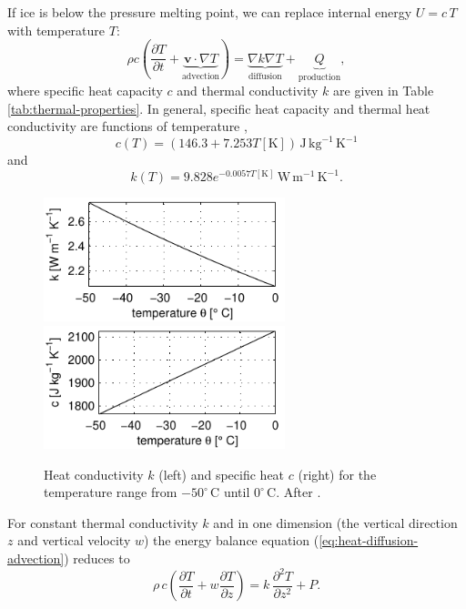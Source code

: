 \documentclass[parskip=half]{scrartcl}
\newcommand{\cels}[1]{\ensuremath{#1^{\circ}\,\mathrm{C}}}
\newcommand{\bv}{\mathbf{v}}
\newcommand{\ddz}[1]{\ensuremath{\frac{\partial #1}{\partial z}}}
\newcommand{\ddt}[1]{\ensuremath{\frac{\partial #1}{\partial t}}}
\newcommand{\grad}{\nabla}
\begin{document}
If ice is below the pressure melting point, we can replace internal
energy $U=c\,T$ with temperature $T$:
\begin{equation}
  \label{eq:temperature-equation} \rho c\left(\ddt{T} + \underbrace{\bv
\cdot \grad T}_{\textrm{advection}}\right) = \underbrace{\nabla
k\nabla T}_{\textrm{diffusion}} +
\underbrace{Q}_{\textrm{production}},
\end{equation} where specific heat capacity $c$ and thermal
conductivity $k$ are given in Table \ref{tab:thermal-properties}. In
general, specific heat capacity and thermal heat conductivity are
functions of temperature \citep[e.g.][]{Ritz1987},
\begin{equation}
  \label{eq:specific-heat} c(T) = (146.3 + 7.253 T
[\text{K}])\,\text{J}\,\text{kg}^{-1}\,\text{K}^{-1}
\end{equation} and
\begin{equation}
  \label{eq:heat-conductivity} k(T) = 9.828 e^{-0.0057 T
[\text{K}]}\,\text{W}\,\text{m}^{-1}\,\text{K}^{-1}.
\end{equation}

\begin{figure} \centering
   \includegraphics[width=7cm]{figures/k} \hfill
   \includegraphics[width=7cm]{figures/c}
   \caption{Heat conductivity $k$ (left) and specific heat $c$ (right)
for the temperature range from \cels{-50} until \cels{0}. After
\cite{Ritz1987}.}
\end{figure}
%
For constant thermal conductivity $k$ and in one dimension (the
vertical direction $z$ and vertical velocity $w$) the energy balance
equation (\ref{eq:heat-diffusion-advection}) reduces to
%
\begin{equation}
 \label{eq:heat-diffusion-advection-1d} \rho\, c \left(\ddt{T} + w
\ddz{T}\right) = k\, \frac{\partial^2T}{\partial z^2} + P.
\end{equation}
\end{document}
